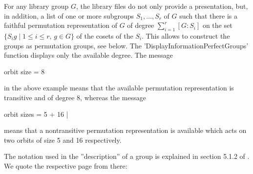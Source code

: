 For any library  group  $G$, the  library  files  do not  only  provide a
presentation, but,  in addition, a  list of  one or  more subgroups $S_1,
\ldots,  S_r$   of  $G$  such   that  there  is   a faithful  permutation
representation of $G$ of degree $\sum_{i=1}^{r}  [G:S_i]$ on the set
$\{  S_i g \mid 1 \leq  i \leq r,  \, g  \in G  \}$  of the cosets of the
$S_i$. This allows to construct the groups as permutation groups, see below.
The 'DisplayInformationPerfectGroups' function
displays only the available degree. The message

\begintt
    orbit size = 8
\endtt

in the above example means  that the available permutation representation
is transitive and of degree 8, whereas the message

\begintt
    orbit sizes = 5 + 16 |
\endtt

means that a nontransitive  permutation representation is available which
acts on two orbits of size 5 and 16 respectively.

The notation used in the  ''description'' of a  group is explained  in
section 5.1.2 of \cite{HP89}. We quote the respective page from there:

